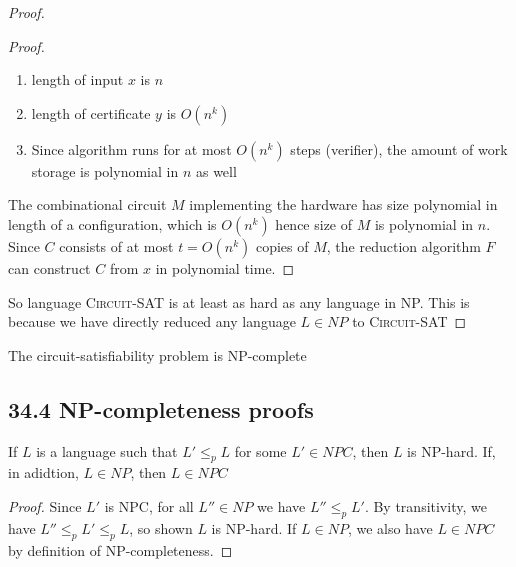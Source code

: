 \documentclass[11pt]{article}
\begin{document}
\begin{lemma*}
\begin{proof}
\begin{enumerate}
\begin{proof}
\begin{enumerate}
                    \item length of input $x$ is $n$
                    \item length of certificate $y$ is $O(n^k)$
                    \item Since algorithm runs for at most $O(n^k)$ steps (verifier), the amount of work storage is polynomial in $n$ as well
                \end{enumerate}
                The combinational circuit $M$ implementing the hardware has size polynomial in length of a configuration, which is $O(n^k)$ hence size of $M$ is polynomial in $n$. Since $C$ consists of at most $t=O(n^k)$ copies of $M$, the reduction algorithm $F$ can construct $C$ from $x$ in polynomial time. 
            \end{proof}
        \end{enumerate}
        So language \textsc{Circuit-SAT} is at least as hard as any language in NP. This is because we have directly reduced any language $L\in NP$ to \textsc{Circuit-SAT} 
    \end{proof}
\end{lemma*}


\begin{theorem*}
    The circuit-satisfiability problem is NP-complete 
\end{theorem*}


\subsection*{34.4 NP-completeness proofs}

\begin{lemma*}
    If $L$ is a language such that $L' \leq_p L$ for some $L' \in NPC$, then $L$ is NP-hard. If, in adidtion, $L\in NP$, then $L\in NPC$
    \begin{proof}
        Since $L'$ is NPC, for all $L''\in NP$ we have $L'' \leq_p L'$. By transitivity, we have $L'' \leq_p L' \leq_p L$, so shown $L$ is NP-hard. If $L\in NP$, we also have $L\in NPC$ by definition of NP-completeness.
    \end{proof}
\end{lemma*}
\end{document}
